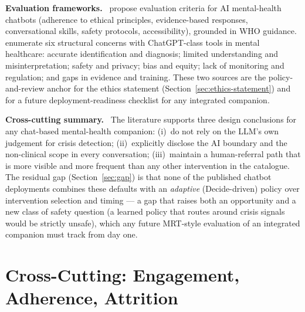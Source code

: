 \documentclass[10pt,conference]{article}
\newcommand{\secref}[1]{Section~\ref{#1}}
\renewcommand{\paragraph}[1]{\smallskip\par\noindent\textbf{#1}~\ignorespaces}
\begin{document}
\paragraph{Evaluation frameworks.}
\cite{Parks2025CriticalEval} propose evaluation criteria for AI
mental-health chatbots (adherence to ethical principles, evidence-based
responses, conversational skills, safety protocols, accessibility),
grounded in WHO guidance. \cite{Pandya2024ChatGPTMHReality} enumerate
six structural concerns with ChatGPT-class tools in mental healthcare:
accurate identification and diagnosis; limited understanding and
misinterpretation; safety and privacy; bias and equity; lack of
monitoring and regulation; and gaps in evidence and training. These
two sources are the policy-and-review anchor for the ethics statement
(\secref{sec:ethics-statement}) and for a future deployment-readiness
checklist for any integrated companion.

\paragraph{Cross-cutting summary.}
The literature supports three design conclusions for any chat-based
mental-health companion: (i)~do not rely on the LLM's own judgement
for crisis detection; (ii)~explicitly disclose the AI boundary and
the non-clinical scope in every conversation; (iii)~maintain a
human-referral path that is more visible and more frequent than any
other intervention in the catalogue. The residual gap
(\secref{sec:gap}) is that none of the published chatbot deployments
combines these defaults with an \emph{adaptive} (Decide-driven)
policy over intervention selection and timing --- a gap that raises
both an opportunity and a new class of safety question (a learned
policy that routes around crisis signals would be strictly unsafe),
which any future MRT-style evaluation of an integrated companion must
track from day one.

\section{Cross-Cutting: Engagement, Adherence, Attrition}\label{sec:engagement}
\end{document}
